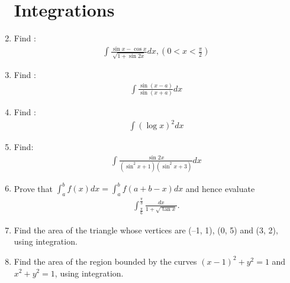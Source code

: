 
\begin{enumerate}
\section{\textbf{Integrations}}
\item Find :
\begin{align*}
    \int \frac{\sin x- \cos x}{\sqrt{1 + \sin 2x}}dx, (0 < x<\frac{\pi}{2})
\end{align*}
\item Find : 
\begin{align*}
\int \frac{\sin(x-a) }{\sin(x+a)}dx
\end{align*}
\item Find :
\begin{align*}
\int (\log x)^2 dx
\end{align*}
\item Find:
\begin{align*}
	\int\frac{\sin 2x}{(\sin^{2}x + 1)(\sin^{2}x + 3)}dx
\end{align*}
\item Prove that $\int_{a}^{b} f(x) dx = \int_{a}^{b} f(a + b - x)dx$ and hence evaluate 
\begin{align*}		
\int_{\frac{\pi}{6}}^{\frac{\pi}{3}} \frac{dx}{1 + \sqrt{\tan x}}.
\end{align*}
\item Find the area of the triangle whose vertices are (–1, 1), (0, 5) and (3, 2), using integration.
\item Find the area of the region bounded by the curves $(x - 1)^{2} + y^{2} = 1$ and $x^{2} + y^{2} = 1$, using integration.
\end{enumerate}
